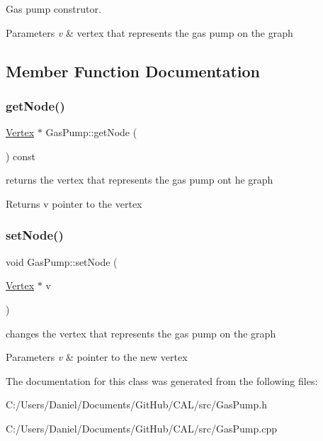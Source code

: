 Gas pump construtor. 


\begin{DoxyParams}{Parameters}
{\em v} & vertex that represents the gas pump on the graph \\
\hline
\end{DoxyParams}


\subsection{Member Function Documentation}
\hypertarget{class_gas_pump_a9e78404587c637783a1c437a0d0c1b4c}{}\label{class_gas_pump_a9e78404587c637783a1c437a0d0c1b4c} 
\subsubsection{\texorpdfstring{get\+Node()}{getNode()}}
{\footnotesize\ttfamily \hyperlink{class_vertex}{Vertex} $\ast$ Gas\+Pump\+::get\+Node (\begin{DoxyParamCaption}{ }\end{DoxyParamCaption}) const}



returns the vertex that represents the gas pump ont he graph 

\begin{DoxyReturn}{Returns}
v pointer to the vertex 
\end{DoxyReturn}
\hypertarget{class_gas_pump_a6540af2cc7221b4395b411a5d6d8c66d}{}\label{class_gas_pump_a6540af2cc7221b4395b411a5d6d8c66d} 
\subsubsection{\texorpdfstring{set\+Node()}{setNode()}}
{\footnotesize\ttfamily void Gas\+Pump\+::set\+Node (\begin{DoxyParamCaption}\item[{\hyperlink{class_vertex}{Vertex} $\ast$}]{v }\end{DoxyParamCaption})}



changes the vertex that represents the gas pump on the graph 


\begin{DoxyParams}{Parameters}
{\em v} & pointer to the new vertex \\
\hline
\end{DoxyParams}


The documentation for this class was generated from the following files\+:\begin{DoxyCompactItemize}
\item 
C\+:/\+Users/\+Daniel/\+Documents/\+Git\+Hub/\+C\+A\+L/src/Gas\+Pump.\+h\item 
C\+:/\+Users/\+Daniel/\+Documents/\+Git\+Hub/\+C\+A\+L/src/Gas\+Pump.\+cpp\end{DoxyCompactItemize}
